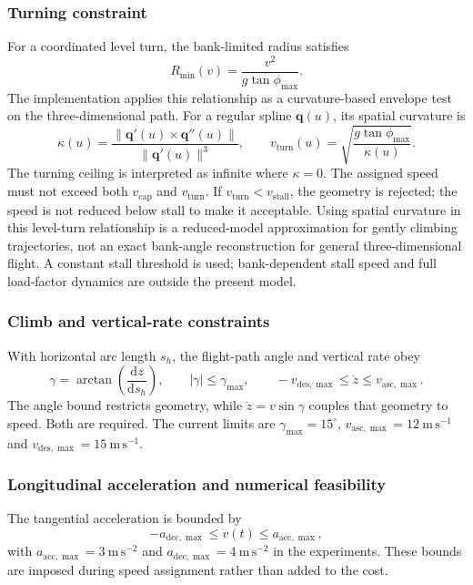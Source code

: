 \documentclass[preprint,12pt]{elsarticle}
\begin{document}
\subsubsection{Turning constraint}
For a coordinated level turn, the bank-limited radius satisfies
\begin{equation}
 R_{\min}(v)=\frac{v^2}{g\tan\phi_{\max}}.
 \label{pr:eq:turnradius}
\end{equation}
The implementation applies this relationship as a curvature-based envelope
test on the three-dimensional path. For a regular spline
$\mathbf{q}(u)$, its spatial curvature is
\begin{equation}
 \kappa(u)=\frac{\|\mathbf{q}'(u)\times\mathbf{q}''(u)\|}
                    {\|\mathbf{q}'(u)\|^3},\qquad
 v_{\mathrm{turn}}(u)=\sqrt{\frac{g\tan\phi_{\max}}{\kappa(u)}}.
 \label{pr:eq:curvature}
\end{equation}
The turning ceiling is interpreted as infinite where $\kappa=0$.
The assigned speed must not exceed both $v_{\mathrm{cap}}$ and
$v_{\mathrm{turn}}$. If $v_{\mathrm{turn}}<v_{\mathrm{stall}}$, the geometry
is rejected; the speed is not reduced below stall to make it acceptable.
Using spatial curvature in this level-turn relationship is a reduced-model
approximation for gently climbing trajectories, not an exact bank-angle
reconstruction for general three-dimensional flight. A constant stall
threshold is used; bank-dependent stall speed and full load-factor dynamics
are outside the present model.

\subsubsection{Climb and vertical-rate constraints}
With horizontal arc length $s_h$, the flight-path angle and vertical rate obey
\begin{equation}
 \gamma=\arctan\left(\frac{\mathrm{d}z}{\mathrm{d}s_h}\right),\qquad
 |\gamma|\le\gamma_{\max},\qquad
 -v_{\mathrm{des},\max}\le\dot z\le v_{\mathrm{asc},\max}.
 \label{pr:eq:vertical}
\end{equation}
The angle bound restricts geometry, while $\dot z=v\sin\gamma$ couples
that geometry to speed. Both are required. The current limits are
$\gamma_{\max}=15^\circ$, $v_{\mathrm{asc},\max}=12~\mathrm{m\,s^{-1}}$
and $v_{\mathrm{des},\max}=15~\mathrm{m\,s^{-1}}$.

\subsubsection{Longitudinal acceleration and numerical feasibility}
The tangential acceleration is bounded by
\begin{equation}
 -a_{\mathrm{dec},\max}\le\dot v(t)\le a_{\mathrm{acc},\max},
 \label{pr:eq:acceleration}
\end{equation}
with $a_{\mathrm{acc},\max}=3~\mathrm{m\,s^{-2}}$ and
$a_{\mathrm{dec},\max}=4~\mathrm{m\,s^{-2}}$ in the experiments.
These bounds are imposed during speed assignment rather than added to the cost.
\end{document}
